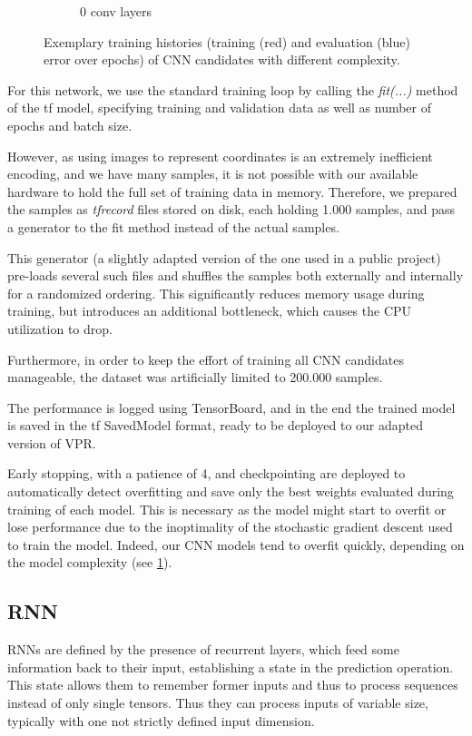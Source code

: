 \begin{figure}
\begin{subfigure}[b]{0.3\linewidth}
		\caption{0 conv layers}
	\end{subfigure}
	\caption{Exemplary training histories (training (red) and evaluation (blue) error over epochs) of \gls{CNN} candidates with different complexity.}
	\label{fig:cnn-train}
\end{figure}

For this network, we use the standard training loop by calling the \textit{fit(...)} method of the \gls{tf} model, specifying training and validation data as well as number of epochs and batch size.

However, as using images to represent coordinates is an extremely inefficient encoding, and we have many samples, it is not possible with our available hardware to hold the full set of training data in memory. Therefore, we prepared the samples as \textit{tfrecord} files stored on disk, each holding 1.000 samples, and pass a generator to the fit method instead of the actual samples.

This generator (a slightly adapted version of the one used in a public project\cite{tfrecord-project-web}) pre-loads several such files and shuffles the samples both externally and internally for a randomized ordering. This significantly reduces memory usage during training, but introduces an additional bottleneck, which causes the CPU utilization to drop.

Furthermore, in order to keep the effort of training all \gls{CNN} candidates manageable, the dataset was artificially limited to 200.000 samples.

The performance is logged using TensorBoard\cite{tensorboard-web}, and in the end the trained model is saved in the \gls{tf} SavedModel format\cite{savedmodel-web}, ready to be deployed to our adapted version of \gls{VPR}.

Early stopping, with a patience of 4, and checkpointing are deployed to automatically detect overfitting and save only the best weights evaluated during training of each model. This is necessary as the model might start to overfit or lose performance due to the inoptimality of the stochastic gradient descent used to train the model. Indeed, our \gls{CNN} models tend to overfit quickly, depending on the model complexity (see \ref{fig:cnn-train}). 

\subsection{\gls{RNN}}

\glspl{RNN} are defined by the presence of recurrent layers, which feed some information back to their input, establishing a state in the prediction operation. This state allows them to remember former inputs and thus to process sequences instead of only single tensors. Thus they can process inputs of variable size, typically with one not strictly defined input dimension.

